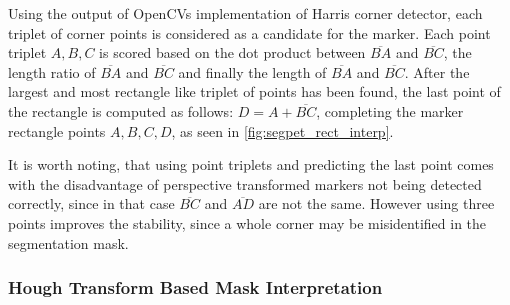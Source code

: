 \documentclass[10pt]{book}
\begin{document}
Using the output of \acp{OpenCV} implementation of Harris corner detector, each triplet of corner points is considered as a candidate for the marker. Each point triplet $A,B,C$ is scored based on the dot product between $\overline{BA}$ and $\overline{BC}$, the length ratio of $\overline{BA}$ and $\overline{BC}$ and finally the length of $\overline{BA}$ and $\overline{BC}$. After the largest and most rectangle like triplet of points has been found, the last point of the rectangle is computed as follows: $D = A + \overline{BC}$, completing the marker rectangle points $A,B,C,D$, as seen in \autoref{fig:segpet_rect_interp}. 

It is worth noting, that using point triplets and predicting the last point comes with the disadvantage of perspective transformed markers not being detected correctly, since in that case $\overline{BC}$ and $\overline{AD}$ are not the same. However using three points improves the stability, since a whole corner may be misidentified in the segmentation mask.


\subsubsection{Hough Transform Based Mask Interpretation}
\end{document}
